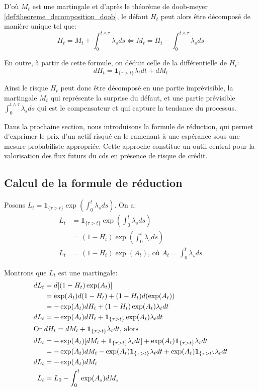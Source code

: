 D'où $M_t$ est une martingale et d'après le théorème de doob-meyer \ref{def:theoreme_decomposition_doob}, le défaut $H_t$ peut alors être décomposé de manière unique tel que:
\begin{equation}
    H_t = M_t + \int_0^{t \land \tau} \lambda_s ds
    \iff
    M_t = H_t - \int_0^{t \land \tau} \lambda_s ds
    \label{eqs:compensateur}
\end{equation}

En outre, à partir de cette formule, on déduit celle de la différentielle de $H_t$:
\begin{equation}
    dH_t = \mathbf{1}_{\{\tau > t\}} \lambda_t dt + dM_t
    \label{eq:differentiel_compensateur}
\end{equation}

Ainsi le risque $H_t$ peut donc être décomposé en une partie imprévisible, la martingale $M_t$ qui représente la surprise du défaut, et une partie prévisible $\int_0^{t \land \tau} \lambda_s ds$ qui est le compensateur et qui capture la tendance du processus.

\bigskip

Dans la prochaine section, nous introduisons la formule de réduction, qui permet d’exprimer le prix d’un actif risqué en le ramenant à une espérance sous une mesure probabiliste appropriée. Cette approche constitue un outil central pour la valorisation des flux futurs du \gls{cds} en présence de risque de crédit.


\subsection{Calcul de la formule de réduction}

Posons $L_t = \mathbf{1}_{\{\tau > t\}}\exp(\int_0^t \lambda_s ds)$. On a:
\begin{align*}
    L_t &= \mathbf{1}_{\{\tau > t\}}\exp(\int_0^t \lambda_s ds) \\
    &= (1 - H_t)\exp(\int_0^t \lambda_s ds) \\
    L_t &= (1 -H_t) \exp(A_t) \text{, où } A_t = \int_0^t \lambda_s ds
\end{align*}

Montrons que $L_t$ est une martingale:
\begin{align*}
    dL_t &= d[(1- H_t)\exp(A_t)] \\
    &= \exp(A_t)d(1 - H_t) + (1 - H_t)d(\exp(A_t)) \\
    &= - \exp(A_t)dH_t + (1 - H_t)\exp(A_t) \lambda_t dt \\
    dL_t &= - \exp(A_t)dH_t + \mathbf{1}_{\{\tau > t\}} \exp(A_t) \lambda_t dt \\
    \intertext{Or $dH_t = dM_t + \mathbf{1}_{\{\tau > t\}}\lambda_t dt$, alors}
    dL_t &= - \exp(A_t)[dM_t + \mathbf{1}_{\{\tau > t\}}\lambda_t dt] + \exp(A_t) \mathbf{1}_{\{\tau > t\}} \lambda_t dt \\
    &= - \exp(A_t)dM_t - \exp(A_t)\mathbf{1}_{\{\tau > t\}}\lambda_t dt + \exp(A_t) \mathbf{1}_{\{\tau > t\}} \lambda_t dt \\
    dL_t &= - \exp(A_t) dM_t \\
    L_t &= L_0 - \int_0^t \exp(A_s)dM_s
\end{align*}

